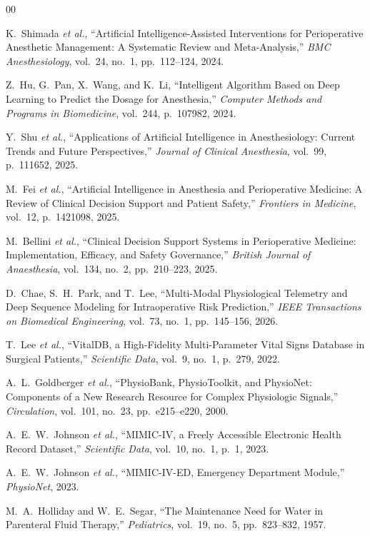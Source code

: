 \documentclass[conference]{IEEEtran}
\begin{document}
\begin{thebibliography}{00}

K.~Shimada \textit{et al.}, ``Artificial Intelligence-Assisted Interventions for Perioperative Anesthetic Management: A Systematic Review and Meta-Analysis,'' \textit{BMC Anesthesiology}, vol.~24, no.~1, pp.~112--124, 2024.

Z.~Hu, G.~Pan, X.~Wang, and K.~Li, ``Intelligent Algorithm Based on Deep Learning to Predict the Dosage for Anesthesia,'' \textit{Computer Methods and Programs in Biomedicine}, vol.~244, p.~107982, 2024.

Y.~Shu \textit{et al.}, ``Applications of Artificial Intelligence in Anesthesiology: Current Trends and Future Perspectives,'' \textit{Journal of Clinical Anesthesia}, vol.~99, p.~111652, 2025.

M.~Fei \textit{et al.}, ``Artificial Intelligence in Anesthesia and Perioperative Medicine: A Review of Clinical Decision Support and Patient Safety,'' \textit{Frontiers in Medicine}, vol.~12, p.~1421098, 2025.

M.~Bellini \textit{et al.}, ``Clinical Decision Support Systems in Perioperative Medicine: Implementation, Efficacy, and Safety Governance,'' \textit{British Journal of Anaesthesia}, vol.~134, no.~2, pp.~210--223, 2025.

D.~Chae, S.~H.~Park, and T.~Lee, ``Multi-Modal Physiological Telemetry and Deep Sequence Modeling for Intraoperative Risk Prediction,'' \textit{IEEE Transactions on Biomedical Engineering}, vol.~73, no.~1, pp.~145--156, 2026.

T.~Lee \textit{et al.}, ``VitalDB, a High-Fidelity Multi-Parameter Vital Signs Database in Surgical Patients,'' \textit{Scientific Data}, vol.~9, no.~1, p.~279, 2022.

A.~L.~Goldberger \textit{et al.}, ``PhysioBank, PhysioToolkit, and PhysioNet: Components of a New Research Resource for Complex Physiologic Signals,'' \textit{Circulation}, vol.~101, no.~23, pp.~e215--e220, 2000.

A.~E.~W.~Johnson \textit{et al.}, ``MIMIC-IV, a Freely Accessible Electronic Health Record Dataset,'' \textit{Scientific Data}, vol.~10, no.~1, p.~1, 2023.

A.~E.~W.~Johnson \textit{et al.}, ``MIMIC-IV-ED, Emergency Department Module,'' \textit{PhysioNet}, 2023.

M.~A.~Holliday and W.~E.~Segar, ``The Maintenance Need for Water in Parenteral Fluid Therapy,'' \textit{Pediatrics}, vol.~19, no.~5, pp.~823--832, 1957.


\end{thebibliography}
\end{document}
